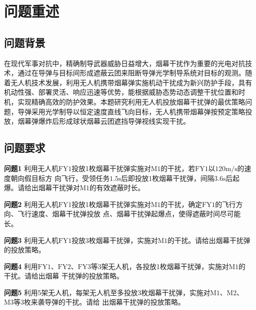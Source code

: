 \section{问题重述}

\subsection{问题背景}

在现代军事对抗中，精确制导武器威胁日益增大，烟幕干扰作为重要的光电对抗技术，通过在导弹与目标间形成遮蔽云团来阻断导弹光学制导系统对目标的观测。随着无人机技术发展，利用无人机携带烟幕弹实施机动干扰成为新兴防护手段，具有机动性强、部署灵活、响应迅速等优势，能根据威胁态势动态调整干扰位置和时机，实现精确高效的防护效果。本题研究利用无人机投放烟幕干扰弹的最优策略问题，导弹采用光学制导以恒定速度直线飞向目标，无人机携带烟幕弹按预定策略投放，烟幕弹爆炸后形成球状烟幕云团遮挡导弹视线实现干扰。

\subsection{问题要求}

\textbf{问题1} 利用无人机$\text{FY1}$投放1枚烟幕干扰弹实施对$\text{M1}$的干扰，若$\text{FY1}$以$120\text{m/s}$的速度朝向假目标方
向飞行，受领任务$1.5\text{s}$后即投放1枚烟幕干扰弹，间隔$3.6\text{s}$后起爆。请给出烟幕干扰弹对$\text{M1}$的有效遮蔽时长。

\textbf{问题2} 利用无人机$\text{FY1}$投放1枚烟幕干扰弹实施对$\text{M1}$的干扰，确定$\text{FY1}$的飞行方向、飞行速度、烟幕干扰弹投放
点、烟幕干扰弹起爆点，使得遮蔽时间尽可能长。

\textbf{问题3} 利用无人机$\text{FY1}$投放3枚烟幕干扰弹，实施对$\text{M1}$的干扰。请给出烟幕干扰弹的投放策略。

\textbf{问题4} 利用$\text{FY1}$、$\text{FY2}$、$\text{FY3}$等3架无人机，各投放1枚烟幕干扰弹，实施对$\text{M1}$的干扰。请给出烟幕
干扰弹的投放策略。

\textbf{问题5} 利用5架无人机，每架无人机至多投放3枚烟幕干扰弹，实施对$\text{M1}$、$\text{M2}$、$\text{M3}$等3枚来袭导弹的干扰。请给
出烟幕干扰弹的投放策略。
